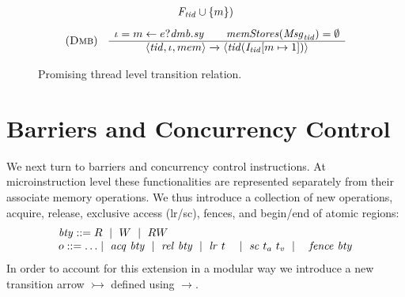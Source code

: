 \begin{figure}
\[\begin{array}{cc}
\begin{array}{c}
     \mathit{F}_{\mathit{tid}}\cup\{m\})
\end{array}
\end{array}
\]
\[
\begin{array}{cc}
(\textsc{Dmb})
&
\begin{array}{c}
\iota = m \leftarrow e ? \mathit{dmb.sy} \qquad
\mathit{memStores}(\mathit{Msg}_{\mathit{tid}}) = \emptyset \\ \hline
\langle \mathit{tid},\iota,mem\rangle \xrightarrow[]{}
\langle \mathit{tid}(\mathit{I}_{\mathit{tid}}[m\mapsto 1])\rangle
\end{array}
\end{array}
\]
%
\caption{Promising thread level transition relation.}
\label{fig:PromisingThreadTransitions}
\end{figure}

 


\section{Barriers and Concurrency Control}
%
We next turn to barriers and concurrency control instructions.
At microinstruction level these functionalities are represented separately from their associate memory operations. 
We thus introduce a collection of new operations, acquire, release, exclusive access (lr/sc), fences, and begin/end of atomic regions:
\[
\begin{array}{l}
\btype ::= R\ \mid\ W\ \mid\ RW \\
o ::= \ldots \mid\ \acq{\btype}\ \mid\ \rel{\btype}\ \mid\ \loadr{t}\ \mid\ \storec{t_a}{t_v}\mid\ \fence{\btype}
\end{array}
\]
In order to account for this extension in a modular way we introduce a
new transition arrow  $\rightarrowtail$ defined using $\rightarrow$.

